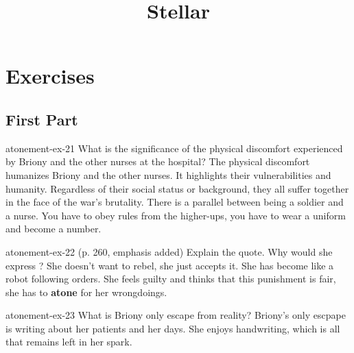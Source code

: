 \documentclass[preview]{standalone}
\begin{document}
\title{Stellar}
\genpage

\section{Exercises}

\subsection{First Part}

\begin{snippetexercise}{atonement-ex-21}
    {What is the significance of the physical discomfort experienced by Briony and the other nurses at
    the hospital?}
    The physical discomfort humanizes Briony and the other nurses.
    It highlights their vulnerabilities and humanity. Regardless of their social
    status or background, they all suffer together in the face of the war's brutality.
    There is a parallel between being a soldier and a nurse. You have to obey
    rules from the higher-ups, you have to wear a uniform and become a number.
\end{snippetexercise}

\begin{snippetexercise}{atonement-ex-22}
    { (p. 260, emphasis added) Explain the quote. Why would she express ?}
    She doesn't want to rebel, she just accepts it. She has become like a robot
    following orders.
    She feels guilty and thinks that this punishment is fair,
    she has to \textbf{atone} for her wrongdoings.
\end{snippetexercise}

\begin{snippetexercise}{atonement-ex-23}
    {What is Briony only escape from reality?}
    Briony's only escpape is writing about her patients and her days.
    She enjoys handwriting, which is all that remains left in her spark.
\end{snippetexercise}
\end{document}
